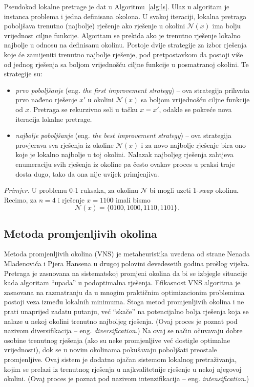 \documentclass[a4paper, utf8, 11pt, colorlinks]{book}
\begin{document}
Pseudokod lokalne pretrage je dat u Algoritmu~\ref{alg:ls}. Ulaz u algoritam je instanca problema i jedna definisana okolona. U svakoj iteraciji, lokalna pretraga poboljšava trenutno (najbolje) rješenje ako    rješenje u okolini  $\mathcal{N}(x)$ ima bolju vrijednost ciljne funkcije. Algoritam se prekida ako je trenutno rješenje lokalno najbolje u odnosu na definisanu okolinu.
 Postoje dvije strategije za izbor rješenja koje će zamijeniti trenutno najbolje rješenje, pod pretpostavkom da postoji više od jednog rješenja sa boljom vrijednošću ciljne funkcije u posmatranoj okolini. Te strategije su:
 \begin{itemize}
 	\item \emph{prvo poboljšanje} (eng. \emph{the first improvement strategy}) -- ova strategija prihvata prvo nađeno rješenje $x'$ u okolini $\mathcal{N}(x)$ sa boljom vrijednošću ciljne funkcije od $x$. Pretraga se rekurzivno seli u tačku  $x = x'$, odakle se pokreće nova iteracija lokalne pretrage.
 	\item \emph{najbolje poboljšanje} (eng. \emph{the best improvement strategy}) --   ova strategija provjerava sva rješenja iz okoline $\mathcal{N}(x)$ i za novo najbolje rješenje bira ono koje je lokalno najbolje u toj okolini. Nalazak  najboljeg rješenja zahtjeva enumeraciju svih rješenja iz okoline pa često ovakav proces u praksi traje dosta dugo,  tako da ona nije uvijek primjenjiva. %
 \end{itemize}
  
  \emph{Primjer.} U   problemu 0-1 ruksaka, za okolinu $\mathcal{N}$ bi mogli uzeti $1$-\emph{swap} okolinu. Recimo, za $n=4$ i rješenje $x=1100$ imali  bismo $$\mathcal{N}(x)= \{ 0100, 1000, 1110, 1101 \}.$$ 
  
\subsection{Metoda promjenljivih okolina}\label{intro:vns}
Metoda promjenljivih okolina (VNS) je metaheuristika uvedena od strane Nenada Mladenovića i Pjera Hansena u drugoj polovini devedesetih godina prošlog vijeka.
Pretraga je zasnovana na sistematskoj promjeni okolina da bi se izbjegle situacije kada algoritam ``upada'' u podoptimalna rješenja. Efikasnost VNS algoritma je zasnovana na razmatranju da u mnogim praktičnim optimizacionim problemima postoji veza između lokalnih minimuma. Stoga metod promjenljivih okolina i ne prati unaprijed zadatu putanju, već ``skače'' na potencijalno bolja rješenja koja se nalaze u nekoj okolini trenutno najboljeg rješenja. (Ovaj proces je poznat pod nazivom diversifikacija -- eng. \emph{diversification}.)
Na ovaj se način očuvavaju dobre osobine trenutnog rješenja (ako su neke promjenljive već dostigle optimalne vrijednosti), dok se u novim okolinama pokušavaju poboljšati preostale promjenljive. Ovaj sistem je dodatno ojačan sistemom lokalnog pretraživanja, kojim se prelazi iz trenutnog rješenja u najkvalitetnije rješenje u nekoj njegovoj okolini. (Ovaj proces je poznat pod nazivom intenzifikacija -- eng. \emph{intensification}.)
\end{document}
